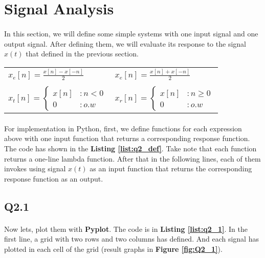 \section{Signal Analysis}
\paragraph{}In this section, we will define some 
simple systems with one input signal and one output 
signal. After defining them, we will evaluate its 
response to the signal $x(t)$ that defined in the
 previous section.
 \begin{center}
\begin{tabular}{ p{5cm} p{5cm} }
 $x_e[n]=\frac{x[n]-x[-n]}{2}$ & $x_e[n]=\frac{x[n]+x[-n]}{2}$  \\ 
  & \\
 $
  x_t[n] = \begin{cases}
   x[n] &: n < 0\\
   0 &: o.w\end{cases}
 $ & $
  x_r[n] = \begin{cases}
   x[n] &: n\geq 0\\
   0 &: o.w\end{cases}
 $  \\  
 
\end{tabular}
\end{center}
\paragraph{}For implementation in Python, first, we 
define functions for each expression above with one input 
function that returns a corresponding response 
function. The code has shown in the 
\textbf{Listing \ref{list:q2_def}}. Take note that each function 
returns a one-line lambda function.
After that in the following lines, each 
of them invokes using signal $x(t)$ as an input 
function that returns the corresponding response 
function as an output.


\subsection{Q2.1}
\paragraph{}Now lets, plot them with 
\textbf{Pyplot}. The code is in 
\textbf{Listing \ref{list:q2_1}}. In the first line, 
a grid with two rows and two columns has defined.
 And each signal has plotted in each cell of the grid (result graphs in \textbf{Figure \ref{fig:Q2_1}}).

